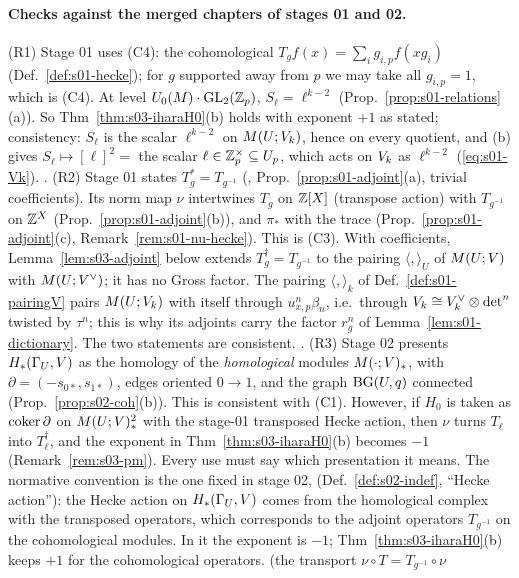 \paragraph{Checks against the merged chapters of stages 01 and 02.}
(R1) Stage 01 uses (C4): the cohomological $T_gf(x)=\sum_ig_{i,p}f(xg_i)$ (Def.~\ref{def:s01-hecke}); for $g$ supported away from $p$ we may take
all $g_{i,p}=1$, which is (C4). At level $U_0(M)\cdot\mathrm{GL}_2(\mathbb{Z}_p)$, $S_\ell=\ell^{k-2}$ (Prop.~\ref{prop:s01-relations}(a)). So
Thm~\ref{thm:s03-iharaH0}(b) holds with exponent $+1$ as stated; consistency: $S_\ell$ is the scalar $\ell^{k-2}$ on $M(U;V_k)$, hence on every
quotient, and (b) gives $S_\ell\mapsto[\ell]^2=$ the scalar $\ell\in\mathbb{Z}_p^\times\subseteq U_p$, which acts on $V_k$ as $\ell^{k-2}$ (\eqref{eq:s01-Vk}).
\stproved.
(R2) Stage 01 states $T_g^*=T_{g^{-1}}$ (, Prop.~\ref{prop:s01-adjoint}(a), trivial coefficients). Its norm map $\nu$
intertwines $T_g$ on $\mathbb{Z}[X]$ (transpose action) with $T_{g^{-1}}$ on $\mathbb{Z}^X$ (Prop.~\ref{prop:s01-adjoint}(b)), and $\pi_*$ with the trace
(Prop.~\ref{prop:s01-adjoint}(c), Remark~\ref{rem:s01-nu-hecke}). This is (C3). With coefficients, Lemma~\ref{lem:s03-adjoint} below extends
$T_g^\dagger=T_{g^{-1}}$ to the pairing $\langle,\rangle_U$ of $M(U;V)$ with $M(U;V^\vee)$; it has no Gross factor. The pairing
$\langle,\rangle_k$ of Def.~\ref{def:s01-pairingV} pairs $M(U;V_k)$ with itself through $u_{x,p}^n\beta_n$, i.e.\ through
$V_k\cong V_k^\vee\otimes{\det}^n$ twisted by $\tau^n$; this is why its adjoints carry the factor $r_g^n$ of Lemma~\ref{lem:s01-dictionary}. The two
statements are consistent. \stproved.
(R3) Stage 02 presents $H_*(\Gamma_U,V)$ as the homology of the \emph{homological} modules $M(\cdot;V)_*$, with $\partial=(-s_{0*},s_{1*})$, edges
oriented $0\to1$, and the graph $\mathrm{BG}(U,q)$ connected (Prop.~\ref{prop:s02-coh}(b)). This is consistent with (C1). However, if $H_0$ is taken as
$\operatorname{coker}\partial$ on $M(U;V)_*^2$ with the stage-01 transposed Hecke action, then $\nu$ turns $T_\ell$ into $T_\ell^\dagger$, and the exponent in
Thm~\ref{thm:s03-iharaH0}(b) becomes $-1$ (Remark~\ref{rem:s03-pm}). Every use must say which presentation it means. The normative convention is the
one fixed in stage 02,  (Def.~\ref{def:s02-indef}, ``Hecke action''): the Hecke action on $H_*(\Gamma_U,V)$ comes from the
homological complex with the transposed operators, which corresponds to the adjoint operators $T_{g^{-1}}$ on the cohomological modules. In it the
exponent is $-1$; Thm~\ref{thm:s03-iharaH0}(b) keeps $+1$ for the cohomological operators. \stproved{} (the transport $\nu\circ T=T_{g^{-1}}\circ\nu$
